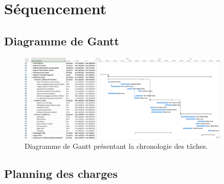 \section{Séquencement}
	\label{sec:sequencement}

	\subsection{Diagramme de Gantt}
	 \begin{figure}[h!]
            \centering
            \includegraphics[width=0.90\textwidth]{figure/DiagGantt.png}
            \caption{Diagramme de Gantt présentant la chronologie des tâches.}
            \label{fig:gantt}
        \end{figure}

	\subsection{Planning des charges}